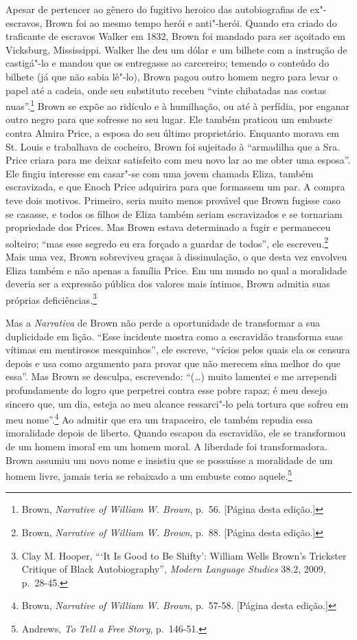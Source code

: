 Apesar de pertencer ao gênero do fugitivo heroico das autobiografias de
ex"-escravos, Brown foi ao mesmo tempo herói e anti"-herói. Quando era
criado do traficante de escravos Walker em 1832, Brown foi mandado para
ser açoitado em Vicksburg, Mississippi. Walker lhe deu um dólar e um
bilhete com a instrução de castigá"-lo e mandou que os entregasse ao
carcereiro; temendo o conteúdo do bilhete (já que não sabia lê"-lo),
Brown pagou outro homem negro para levar o papel até a cadeia, onde seu
substituto recebeu ``vinte chibatadas nas costas
nuas''.\footnote{Brown, \emph{Narrative of William W. Brown}, p.~56.
  {[}Página \pageref{ref2} desta edição.{]}} Brown se expõe ao ridículo e à
humilhação, ou até à perfídia, por enganar outro negro para que sofresse
no seu lugar. Ele também praticou um embuste contra Almira Price, a
esposa do seu último proprietário. Enquanto morava em St. Louis e
trabalhava de cocheiro, Brown foi sujeitado à ``armadilha que a Sra.
Price criara para me deixar satisfeito com meu novo lar ao me obter uma
esposa''. Ele fingiu interesse em casar"-se com uma jovem chamada Eliza,
também escravizada, e que Enoch Price adquirira para que formassem um
par. A compra teve dois motivos. Primeiro, seria muito menos provável
que Brown fugisse caso se casasse, e todos os filhos de Eliza também
seriam escravizados e se tornariam propriedade dos Prices. Mas Brown
estava determinado a fugir e permaneceu solteiro; ``mas esse segredo eu
era forçado a guardar de todos'', ele escreveu.\footnote{Brown,
  \emph{Narrative of William W. Brown}, p.~88. {[}Página \pageref{ref3} desta
  edição.{]}} Mais uma vez, Brown sobreviveu graças à dissimulação, o
que desta vez envolveu Eliza também e não apenas a família Price. Em um
mundo no qual a moralidade deveria ser a expressão pública dos valores
mais íntimos, Brown admitia suas próprias deficiências.\footnote{Clay M.
  Hooper, ```It Is Good to Be Shifty': William Wells Brown's Trickster
  Critique of Black Autobiography'', \emph{Modern Language Studies} 38.2,
  2009, p.~28-45.}

Mas a \emph{Narrativa} de Brown não perde a oportunidade de transformar
a sua duplicidade em lição. ``Esse incidente mostra como a
escravidão transforma suas vítimas em mentirosos mesquinhos'', ele
escreve, ``vícios pelos quais ela os censura depois e usa como argumento
para provar que não merecem sina melhor do que essa''. Mas Brown se
desculpa, escrevendo: ``(\ldots{}) muito lamentei e me arrependi
profundamente do logro que perpetrei contra esse pobre rapaz; é meu
desejo sincero que, um dia, esteja ao meu alcance ressarci"-lo pela
tortura que sofreu em meu nome''.\footnote{Brown, \emph{Narrative of
  William W. Brown}, p.~57-58. {[}Página \pageref{ref4} desta edição.{]}} Ao admitir
que era um trapaceiro, ele também repudia essa imoralidade depois de
liberto. Quando escapou da escravidão, ele se transformou de um homem
imoral em um homem moral. A liberdade foi transformadora. Brown assumiu
um novo nome e insistiu que se possuísse a moralidade de um homem livre,
jamais teria se rebaixado a um embuste como aquele.\footnote{Andrews,
  \emph{To Tell a Free Story}, p.~146-51.}

